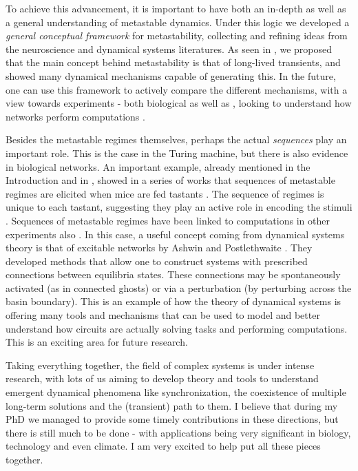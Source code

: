 To achieve this advancement, it is important to have both an in-depth as well as a general understanding of metastable dynamics. Under this logic we developed a \textit{general conceptual framework} for metastability, collecting and refining ideas from the neuroscience and dynamical systems literatures. As seen in , we proposed that the main concept behind metastability is that of long-lived transients, and showed many dynamical mechanisms capable of generating this. In the future, one can use this framework to actively compare the different mechanisms, with a view towards experiments - both biological as well as , looking to understand how networks perform computations \cite{koch2024biological}.

Besides the metastable regimes themselves, perhaps the actual \textit{sequences} play an important role. This is the case in the Turing machine, but there is also evidence in biological networks. An important example, already mentioned in the Introduction and in , showed in a series of works that sequences of metastable regimes are elicited when mice are fed tastants \cite{jones2007natural}. The sequence of regimes is unique to each tastant, suggesting they play an active role in encoding the stimuli \cite{lacamera2019cortical}. Sequences of metastable regimes have been linked to computations in other experiments also \cite{mazor2005transient, lacamera2019cortical, driscoll2024flexible}. In this case, a useful concept coming from dynamical systems theory is that of excitable networks by Ashwin and Postlethwaite \cite{ashwin2021excitable, ashwin2024network}. They developed methods that allow one to construct systems with prescribed connections between equilibria states. These connections may be spontaneously activated (as in connected ghosts) or via a perturbation (by perturbing across the basin boundary). This is an example of how the theory of dynamical systems is offering many tools and mechanisms that can be used to model and better understand how circuits are actually solving tasks and performing computations. This is an exciting area for future research.

Taking everything together, the field of complex systems is under intense research, with lots of us aiming to develop theory and tools to understand emergent dynamical phenomena like synchronization, the coexistence of multiple long-term solutions and the (transient) path to them. I believe that during my PhD we managed to provide some timely contributions in these directions, but there is still much to be done - with applications being very significant in biology, technology and even climate. I am very excited to help put all these pieces together.



